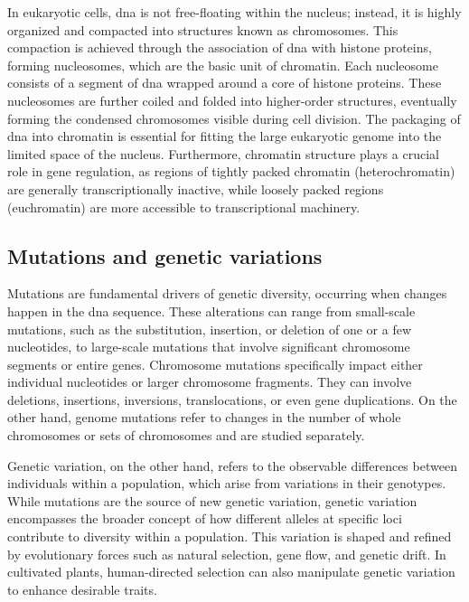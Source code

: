 In eukaryotic cells, \ac{dna} is not free-floating within the nucleus; instead, it is highly organized and compacted into structures known as chromosomes. This compaction is achieved through the association of \ac{dna} with histone proteins, forming nucleosomes, which are the basic unit of chromatin. Each nucleosome consists of a segment of \ac{dna} wrapped around a core of histone proteins. These nucleosomes are further coiled and folded into higher-order structures, eventually forming the condensed chromosomes visible during cell division. The packaging of \ac{dna} into chromatin is essential for fitting the large eukaryotic genome into the limited space of the nucleus. Furthermore, chromatin structure plays a crucial role in gene regulation, as regions of tightly packed chromatin (heterochromatin) are generally transcriptionally inactive, while loosely packed regions (euchromatin) are more accessible to transcriptional machinery. \cite{Minchin2019}

\subsection{Mutations and genetic variations} \label{subsec:genetics_mutations}

Mutations are fundamental drivers of genetic diversity, occurring when changes happen in the \ac{dna} sequence. These alterations can range from small-scale mutations, such as the substitution, insertion, or deletion of one or a few nucleotides, to large-scale mutations that involve significant chromosome segments or entire genes. Chromosome mutations specifically impact either individual nucleotides or larger chromosome fragments. They can involve deletions, insertions, inversions, translocations, or even gene duplications. On the other hand, genome mutations refer to changes in the number of whole chromosomes or sets of chromosomes and are studied separately. \cite{merrick2016}

Genetic variation, on the other hand, refers to the observable differences between individuals within a population, which arise from variations in their genotypes. While mutations are the source of new genetic variation, genetic variation encompasses the broader concept of how different alleles at specific loci contribute to diversity within a population. This variation is shaped and refined by evolutionary forces such as natural selection, gene flow, and genetic drift. In cultivated plants, human-directed selection can also manipulate genetic variation to enhance desirable traits. \cite{merrick2016}

